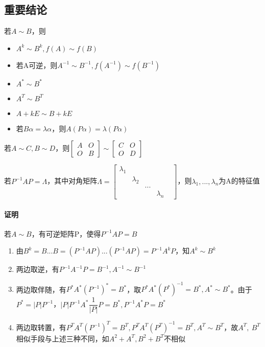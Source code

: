 \subsection{重要结论}
若\(A \sim B\)，则
\begin{itemize}
    \item \(A^k \sim B^k, f(A) \sim f(B)\)
    \item 若A可逆，则\(A^{-1} \sim B^{-1}, f(A^{-1}) \sim f(B^{-1})\)
    \item \(A^* \sim B^*\)
    \item \(A^T \sim B^T\)
    \item \(A + kE \sim B + kE\)
    \item 若\(B\alpha = \lambda\alpha\)，则\(A(P\alpha) = \lambda(P\alpha)\)
\end{itemize}

若\(A \sim C, B \sim D\)，则\(\begin{bmatrix}
    A & O \\ 
    O & B
\end{bmatrix} \sim \begin{bmatrix}
    C & O \\ 
    O & D
\end{bmatrix}\)

若\(P^{-1}AP = \Lambda\)，其中对角矩阵\(\Lambda = \begin{bmatrix}
\lambda_1 & & & & \\ 
& \lambda_2 & \\ 
& & ... \\ 
& & & \lambda_n
\end{bmatrix}\)，则\(\lambda_1, ..., \lambda_n\)为A的特征值

\paragraph{证明}
若\(A \sim B\)，有可逆矩阵P，使得\(P^{-1}AP = B\)
\begin{enumerate}
    \item 由\(B^k = B...B = (P^{-1}AP)...(P^{-1}AP) = P^{-1}A^kP\)，知\(A^k \sim B^k\)
    \item 两边取逆，有\(P^{-1}A^{-1}P = B^{-1}, A^{-1} \sim B^{-1}\)
    \item 两边取伴随，有\(P^*A^*(P^{-1})^* = B^*\)，取\(P^*A^*(P^*)^{-1} = B^*, A^* \sim B^*\)。由于\(P^* = |P|P^{-1}\)，\(|P|P^{-1}A^*\dfrac{1}{|P|}P = B^*, P^{-1}A^*P = B^*\)
    \item 两边取转置，有\(P^TA^T(P^{-1})^T = B^T, P^TA^T(P^T)^{-1} = B^T, A^T \sim B^T\)，故\(A^T,\ B^T\)相似手段与上述三种不同，如\(A^2 + A^T, B^2 + B^T\)不相似
\end{enumerate}


